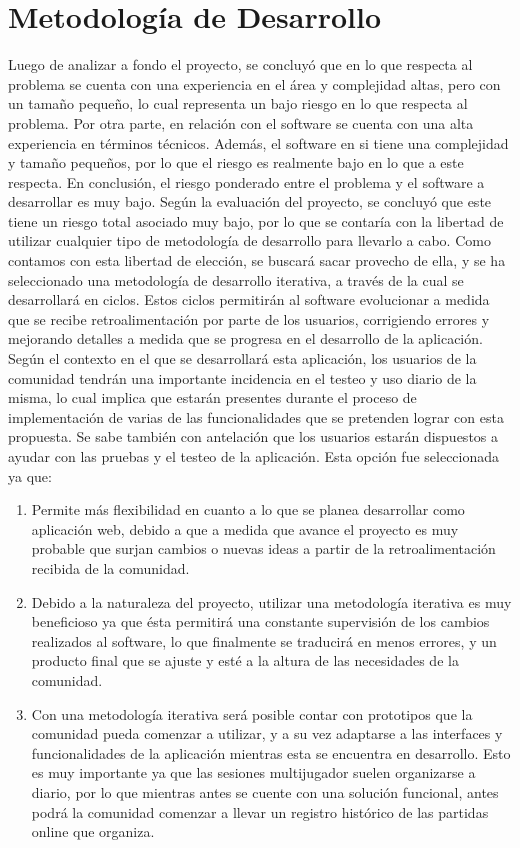\section{Metodología de Desarrollo}
Luego de analizar a fondo el proyecto, se concluyó que en lo que respecta al problema se cuenta con una experiencia en el área y complejidad altas, pero con un tamaño pequeño, lo cual representa un bajo riesgo en lo que respecta al problema. Por otra parte, en relación con el software se cuenta con una alta experiencia en términos técnicos. Además, el software en si tiene una complejidad y tamaño pequeños, por lo que el riesgo es realmente bajo en lo que a este respecta. En conclusión, el riesgo ponderado entre el problema y el software a desarrollar es muy bajo.
Según la evaluación del proyecto, se concluyó que este tiene un riesgo total asociado muy bajo, por lo que se contaría con la libertad de utilizar cualquier tipo de metodología de desarrollo para llevarlo a cabo. Como contamos con esta libertad de elección, se buscará sacar provecho de ella, y se ha seleccionado una metodología de desarrollo iterativa, a través de la cual se desarrollará en ciclos. Estos ciclos permitirán al software evolucionar a medida que se recibe retroalimentación por parte de los usuarios, corrigiendo errores y mejorando detalles a medida que se progresa en el desarrollo de la aplicación. Según el contexto en el que se desarrollará esta aplicación, los usuarios de la comunidad tendrán una importante incidencia en el testeo y uso diario de la misma, lo cual implica que estarán presentes durante el proceso de implementación de varias de las funcionalidades que se pretenden lograr con esta propuesta. Se sabe también con antelación que los usuarios estarán dispuestos a ayudar con las pruebas y el testeo de la aplicación. Esta opción fue seleccionada ya que:

\begin{enumerate}
	\item Permite más flexibilidad en cuanto a lo que se planea desarrollar como aplicación web, debido a que a medida que avance el proyecto es muy probable que surjan cambios o nuevas ideas a partir de la retroalimentación recibida de la comunidad.
	\item Debido a la naturaleza del proyecto, utilizar una metodología iterativa es muy beneficioso ya que ésta permitirá una constante supervisión de los cambios realizados al software, lo que finalmente se traducirá en menos errores, y un producto final que se ajuste y esté a la altura de las necesidades de la comunidad.
	\item Con una metodología iterativa será posible contar con prototipos que la comunidad pueda comenzar a utilizar, y a su vez adaptarse a las interfaces y funcionalidades de la aplicación mientras esta se encuentra en desarrollo. Esto es muy importante ya que las sesiones multijugador suelen organizarse a diario, por lo que mientras antes se cuente con una solución funcional, antes podrá la comunidad comenzar a llevar un registro histórico de las partidas online que organiza.
\end{enumerate}

